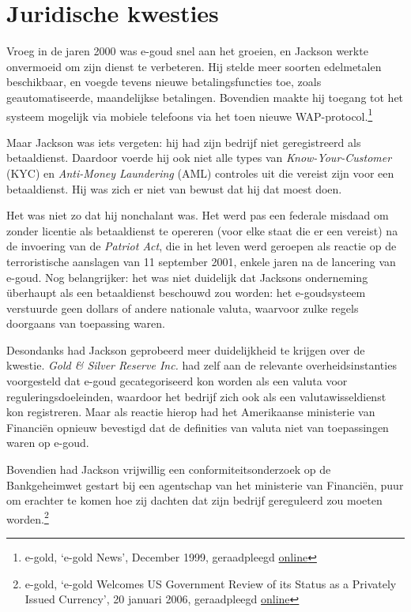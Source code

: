 \documentclass[
  a5paper,
  smalldemyvopaper,11pt,twoside,onecolumn,openright,extrafontsizes]{memoir}
\begin{document}
\section*{Juridische kwesties}\label{juridische-kwesties}


Vroeg in de jaren 2000 was e-goud snel aan het groeien, en Jackson
werkte onvermoeid om zijn dienst te verbeteren. Hij stelde meer soorten
edelmetalen beschikbaar, en voegde tevens nieuwe betalingsfuncties toe,
zoals geautomatiseerde, maandelijkse betalingen. Bovendien maakte hij
toegang tot het systeem mogelijk via mobiele telefoons via het toen
nieuwe WAP-protocol.\footnote{\hspace{0pt}e-gold, `e-gold News',
  December 1999, geraadpleegd
  \href{https://web.archive.org/web/20001209053900fw_/http://www.e-gold.com/news.html.}{online}}

Maar Jackson was iets vergeten: hij had zijn bedrijf niet geregistreerd
als betaaldienst. Daardoor voerde hij ook niet alle types van
\emph{Know-Your-Customer} (KYC) en \emph{Anti-Money Laundering} (AML)
controles uit die vereist zijn voor een betaaldienst. Hij was zich er
niet van bewust dat hij dat moest doen.

Het was niet zo dat hij nonchalant was. Het werd pas een federale
misdaad om zonder licentie als betaaldienst te opereren (voor elke staat
die er een vereist) na de invoering van de \emph{Patriot Act}, die in
het leven werd geroepen als reactie op de terroristische aanslagen van
11 september 2001, enkele jaren na de lancering van e-goud. Nog
belangrijker: het was niet duidelijk dat Jacksons onderneming überhaupt
als een betaaldienst beschouwd zou worden: het e-goudsysteem verstuurde
geen dollars of andere nationale valuta, waarvoor zulke regels doorgaans
van toepassing waren.

Desondanks had Jackson geprobeerd meer duidelijkheid te krijgen over de
kwestie. \emph{Gold \& Silver Reserve Inc.} had zelf aan de relevante
overheidsinstanties voorgesteld dat e-goud gecategoriseerd kon worden
als een valuta voor reguleringsdoeleinden, waardoor het bedrijf zich ook
als een valutawisseldienst kon registreren. Maar als reactie hierop had
het Amerikaanse ministerie van Financiën opnieuw bevestigd dat de
definities van valuta niet van toepassingen waren op e-goud.

Bovendien had Jackson vrijwillig een conformiteitsonderzoek op de
Bankgeheimwet gestart bij een agentschap van het ministerie van
Financiën, puur om erachter te komen hoe zij dachten dat zijn bedrijf
gereguleerd zou moeten worden.\footnote{\hspace{0pt}e-gold, `e-gold
  Welcomes US Government Review of its Status as a Privately Issued
  Currency', 20 januari 2006, geraadpleegd
  \href{https://web.archive.org/web/20060304203618if_/http://www.e-gold.com/letter2.html.}{online}}
\end{document}
